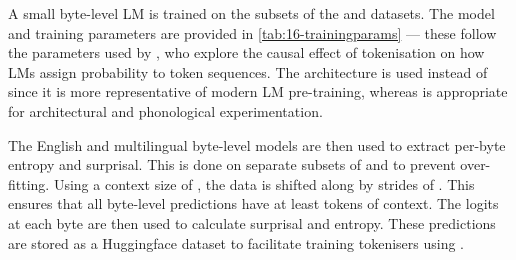 
A small byte-level LM is trained on the subsets of the \fineweb and \commoncorpus datasets. The model and training parameters are provided in \cref{tab:16-trainingparams} --- these follow the parameters used by \citet{lesci2025causal}, who explore the causal effect of tokenisation on how LMs assign probability to token sequences. The \llama architecture is used instead of \gpt since it is more representative of modern LM pre-training, whereas \gpt is appropriate for architectural and phonological experimentation.


The English and multilingual byte-level models are then used to extract per-byte entropy and surprisal. This is done on separate subsets of \fineweb and \commoncorpus to prevent over-fitting. Using a context size of , the data is shifted along by strides of . This ensures that all byte-level predictions have at least  tokens of context. The logits at each byte are then used to calculate surprisal and entropy. These predictions are stored as a Huggingface dataset to facilitate training tokenisers using \tokname.

